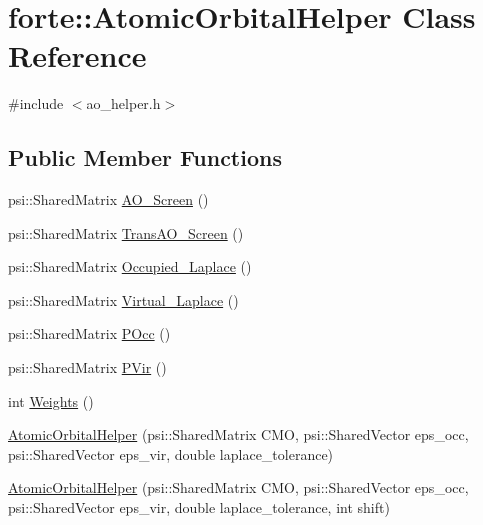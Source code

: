 \hypertarget{classforte_1_1_atomic_orbital_helper}{}\section{forte\+:\+:Atomic\+Orbital\+Helper Class Reference}
\label{classforte_1_1_atomic_orbital_helper}


{\ttfamily \#include $<$ao\+\_\+helper.\+h$>$}

\subsection*{Public Member Functions}
\begin{DoxyCompactItemize}
\item 
psi\+::\+Shared\+Matrix \mbox{\hyperlink{classforte_1_1_atomic_orbital_helper_aae3faca1d68ec5b2da4e2dbe2b3c0c76}{A\+O\+\_\+\+Screen}} ()
\item 
psi\+::\+Shared\+Matrix \mbox{\hyperlink{classforte_1_1_atomic_orbital_helper_a436f7437af75a2bb5bdf0926b4a128e5}{Trans\+A\+O\+\_\+\+Screen}} ()
\item 
psi\+::\+Shared\+Matrix \mbox{\hyperlink{classforte_1_1_atomic_orbital_helper_adda71a215917ca372968507cd5253d91}{Occupied\+\_\+\+Laplace}} ()
\item 
psi\+::\+Shared\+Matrix \mbox{\hyperlink{classforte_1_1_atomic_orbital_helper_a30cf42f4d768185645e8e07a45da8e22}{Virtual\+\_\+\+Laplace}} ()
\item 
psi\+::\+Shared\+Matrix \mbox{\hyperlink{classforte_1_1_atomic_orbital_helper_a8e8dadd03ee3485dc4b26bba84759e3f}{P\+Occ}} ()
\item 
psi\+::\+Shared\+Matrix \mbox{\hyperlink{classforte_1_1_atomic_orbital_helper_a8eab87d87f3560ca1e35c48d6e017ca1}{P\+Vir}} ()
\item 
int \mbox{\hyperlink{classforte_1_1_atomic_orbital_helper_aba981b8d86dd9418ac491b6529363507}{Weights}} ()
\item 
\mbox{\hyperlink{classforte_1_1_atomic_orbital_helper_a14a54771aec07f989de0504907007923}{Atomic\+Orbital\+Helper}} (psi\+::\+Shared\+Matrix C\+MO, psi\+::\+Shared\+Vector eps\+\_\+occ, psi\+::\+Shared\+Vector eps\+\_\+vir, double laplace\+\_\+tolerance)
\item 
\mbox{\hyperlink{classforte_1_1_atomic_orbital_helper_ad22eb22a692b1d690bbfe0acc629c1c4}{Atomic\+Orbital\+Helper}} (psi\+::\+Shared\+Matrix C\+MO, psi\+::\+Shared\+Vector eps\+\_\+occ, psi\+::\+Shared\+Vector eps\+\_\+vir, double laplace\+\_\+tolerance, int shift)

\end{DoxyCompactItemize}
